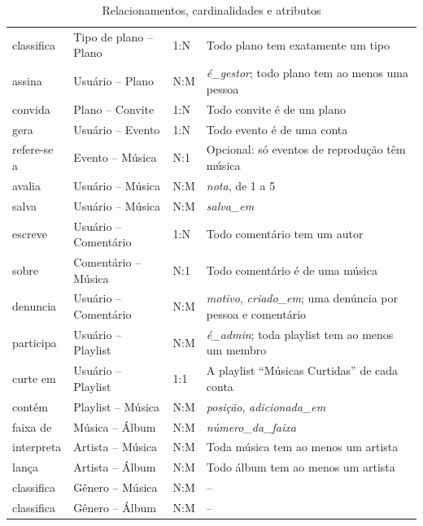 \begin{table}[htbp]
  \centering
  \caption{Relacionamentos, cardinalidades e atributos}
  \label{tab:relacionamentos}
  \small
  \begin{tabularx}{\textwidth}{@{}L{0.85}L{1.2}L{0.45}L{1.5}@{}}
    \toprule
     &  &  &  \\
    \midrule
    classifica & Tipo de plano -- Plano & 1:N & Todo plano tem exatamente um tipo \\
    assina & Usuário -- Plano & N:M & \emph{é\_gestor}; todo plano tem ao menos uma pessoa \\
    convida & Plano -- Convite & 1:N & Todo convite é de um plano \\
    gera & Usuário -- Evento & 1:N & Todo evento é de uma conta \\
    refere-se a & Evento -- Música & N:1 & Opcional: só eventos de reprodução têm música \\
    avalia & Usuário -- Música & N:M & \emph{nota}, de 1 a 5 \\
    salva & Usuário -- Música & N:M & \emph{salva\_em} \\
    escreve & Usuário -- Comentário & 1:N & Todo comentário tem um autor \\
    sobre & Comentário -- Música & N:1 & Todo comentário é de uma música \\
    denuncia & Usuário -- Comentário & N:M & \emph{motivo}, \emph{criado\_em}; uma denúncia por pessoa e comentário \\
    participa & Usuário -- Playlist & N:M & \emph{é\_admin}; toda playlist tem ao menos um membro \\
    curte em & Usuário -- Playlist & 1:1 & A playlist ``Músicas Curtidas'' de cada conta \\
    contém & Playlist -- Música & N:M & \emph{posição}, \emph{adicionada\_em} \\
    faixa de & Música -- Álbum & N:M & \emph{número\_da\_faixa} \\
    interpreta & Artista -- Música & N:M & Toda música tem ao menos um artista \\
    lança & Artista -- Álbum & N:M & Todo álbum tem ao menos um artista \\
    classifica & Gênero -- Música & N:M & -- \\
    classifica & Gênero -- Álbum & N:M & -- \\
    \bottomrule
  \end{tabularx}
\end{table}

